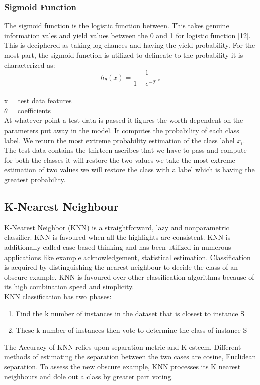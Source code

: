 \documentclass[oneside,12pt]{Classes/VTU}
\begin{document}
    		
    
    	\subsubsection{Sigmoid Function}
    		The sigmoid function is the logistic function between. This takes genuine information vales and yield values between the 0 and 1 for logistic function [12]. This is deciphered as taking log chances and having the yield probability. For the most part, the sigmoid function is utilized to delineate to the probability it is characterized as:
    		\[ h_\theta(x) = \frac{1}{1 + e^{-\theta^{T.x}}} \]\\
    		x = test data features \\
    		$\theta$ = coefficients \\
    		At whatever point a test data is passed it figures the worth dependent on the parameters put away in the model. It computes the probability of each class label. We return the most extreme probability estimation of the class label $x_i$.\\ 
    		
    		The test data contains the thirteen ascribes that we have to pass and compute for both the classes it will restore the two values we take the most extreme estimation of two values we will restore the class with a label which is having the greatest probability.
    	
    	
    	
    		
    		\subsection{K-Nearest Neighbour}  
    		K-Nearest Neighbor (KNN) is a straightforward, lazy and nonparametric classifier. KNN is favoured when all the highlights are consistent. KNN is additionally called case-based thinking and has been utilized in numerous applications like example acknowledgement, statistical estimation. Classification is acquired by distinguishing the nearest neighbour to decide the class of an obscure example. KNN is favoured over other classification algorithms because of its high combination speed and simplicity.\\ 
    		
    		KNN classification has two phases:
    		\begin{enumerate}
    			\item Find the k number of instances in the dataset that is closest to instance S
    			\item These k number of instances then vote to determine the class of instance S
    		\end{enumerate}
    		The Accuracy of KNN relies upon separation metric and K esteem. Different methods of estimating the separation between the two cases are cosine, Euclidean separation. To assess the new obscure example, KNN processes its K nearest neighbours and dole out a class by greater part voting.\\ 
    		
\end{document}
